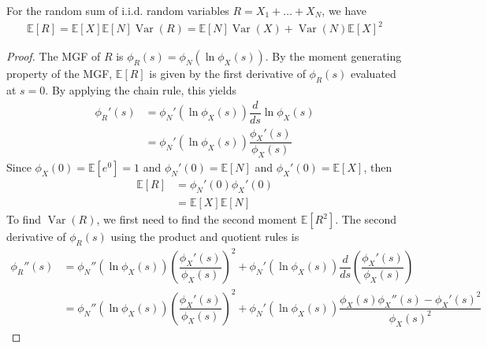 \documentclass[11pt]{report} %
\begin{document}
\begin{theorem}
For the random sum of i.i.d. random variables $R = X_{1} + \dots + X_{N}$, we have
\begin{gather}
\mathbb{E}\left[R\right] = \mathbb{E}\left[X\right]\mathbb{E}\left[N\right]
\operatorname{Var}\left(R\right) = \mathbb{E}\left[N\right]\operatorname{Var}\left(X\right) + \operatorname{Var}\left(N\right)\mathbb{E}\left[X\right]^{2}
\end{gather}
\end{theorem}
\begin{proof}
The MGF of $R$ is $\phi_{R}\left(s\right) = \phi_{N}\left(\ln \phi_{X}\left(s\right) \right)$. By the moment generating property of the MGF, $\mathbb{E}\left[R\right]$ is given by the first derivative of $\phi_{R}\left(s\right)$ evaluated at $s = 0$. By applying the chain rule, this yields
\begin{align}
\phi_{R}'\left(s\right) &= \phi_{N}'\left(\ln\phi_{X}\left(s\right)\right)\dfrac{d}{ds}\ln\phi_{X}\left(s\right) \\
&= \phi_{N}'\left(\ln\phi_{X}\left(s\right)\right)\dfrac{\phi_{X}'\left(s\right)}{\phi_{X}\left(s\right)}
\end{align}
Since $\phi_{X}\left(0\right) = \mathbb{E}\left[e^{0}\right] = 1$ and $\phi_{N}'\left(0\right) = \mathbb{E}\left[N\right]$ and $\phi_{X}'\left(0\right) = \mathbb{E}\left[X\right]$, then
\begin{align}
\mathbb{E}\left[R\right] &= \phi_{N}'\left(0\right)\phi_{X}'\left(0\right) \\
&= \mathbb{E}\left[X\right]\mathbb{E}\left[N\right]
\end{align}
To find $\operatorname{Var}\left(R\right)$, we first need to find the second moment $\mathbb{E}\left[R^{2}\right]$. The second derivative of $\phi_{R}\left(s\right)$ using the product and quotient rules is
\begin{align}
\phi_{R}''\left(s\right) &= \phi_{N}''\left(\ln\phi_{X}\left(s\right)\right)\left(\dfrac{\phi_{X}'\left(s\right)}{\phi_{X}\left(s\right)}\right)^{2} + \phi_{N}'\left(\ln\phi_{X}\left(s\right)\right)\dfrac{d}{ds}\left(\dfrac{\phi_{X}'\left(s\right)}{\phi_{X}\left(s\right)}\right) \\
&= \phi_{N}''\left(\ln\phi_{X}\left(s\right)\right)\left(\dfrac{\phi_{X}'\left(s\right)}{\phi_{X}\left(s\right)}\right)^{2}+\phi_{N}'\left(\ln\phi_{X}\left(s\right)\right)\dfrac{\phi_{X}\left(s\right)\phi_{X}''\left(s\right)-\phi_{X}'\left(s\right)^{2}}{\phi_{X}\left(s\right)^{2}}
\end{align}

\end{proof}
\end{document}
